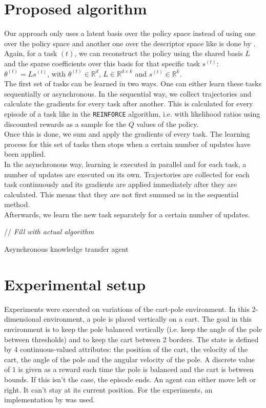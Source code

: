 \documentclass[a4paper]{article}
\begin{document}
\section{Proposed algorithm}
Our approach only uses a latent basis over the policy space instead of using one over the policy space and another one over the descriptor space like is done by \cite{Isele2016UsingLearning}. Again, for a task $(t)$, we can reconstruct the policy using the shared basis $L$ and the sparse coefficients over this basis for that specific task $s^{(t)}$: $\theta^{(t)} = Ls^{(t)}$, with $\theta^{(t)} \in \mathbb{R}^d$, $L \in \mathbb{R}^{d \times k}$ and $s^{(t)} \in \mathbb{R}^k$.\\

The first set of tasks can be learned in two ways. One can either learn these tasks sequentially or asynchronous. In the sequential way, we collect trajectories and calculate the gradients for every task after another. This is calculated for every episode of a task like in the \texttt{REINFORCE} algorithm, i.e. with likelihood ratios using discounted rewards as a sample for the $Q$ values of the policy.\\
Once this is done, we sum and apply the gradients of every task. The learning process for this set of tasks then stops when a certain number of updates have been applied.\\
In the asynchronous way, learning is executed in parallel and for each task, a number of updates are executed on its own. Trajectories are collected for each task continuously and its gradients are applied immediately after they are calculated. This means that they are not first summed as in the sequential method.\\
Afterwards, we learn the new task separately for a certain number of updates.\\
\begin{algorithm}[H]
\DontPrintSemicolon
// \emph{Fill with actual algorithm}\;
\caption{Asynchronous knowledge transfer agent}
\end{algorithm}
\section{Experimental setup}
Experiments were executed on variations of the cart-pole environment.
In this 2-dimensional environment, a pole is placed vertically on a cart. The goal in this environment is to keep the pole balanced vertically (i.e. keep the angle of the pole between thresholds) and to keep the cart between 2 borders. The state is defined by 4 continuous-valued attributes: the position of the cart, the velocity of the cart, the angle of the pole and the angular velocity of the pole. A discrete value of $1$ is given as a reward each time the pole is balanced and the cart is between bounds. If this isn't the case, the episode ends. An agent can either move left or right. It can't stay at its current position. For the experiments, an implementation by \cite{Brockman2016OpenAIGym} was used.\\
\end{document}
